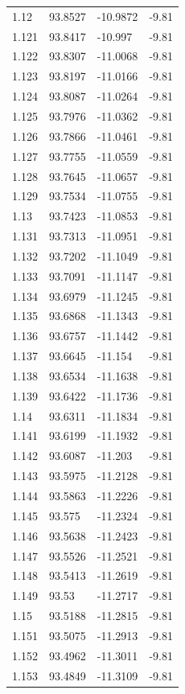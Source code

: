 \begin{tabular}{llll}
1.12 & 93.8527 & -10.9872 & -9.81 \\
1.121 & 93.8417 & -10.997 & -9.81 \\
1.122 & 93.8307 & -11.0068 & -9.81 \\
1.123 & 93.8197 & -11.0166 & -9.81 \\
1.124 & 93.8087 & -11.0264 & -9.81 \\
1.125 & 93.7976 & -11.0362 & -9.81 \\
1.126 & 93.7866 & -11.0461 & -9.81 \\
1.127 & 93.7755 & -11.0559 & -9.81 \\
1.128 & 93.7645 & -11.0657 & -9.81 \\
1.129 & 93.7534 & -11.0755 & -9.81 \\
1.13 & 93.7423 & -11.0853 & -9.81 \\
1.131 & 93.7313 & -11.0951 & -9.81 \\
1.132 & 93.7202 & -11.1049 & -9.81 \\
1.133 & 93.7091 & -11.1147 & -9.81 \\
1.134 & 93.6979 & -11.1245 & -9.81 \\
1.135 & 93.6868 & -11.1343 & -9.81 \\
1.136 & 93.6757 & -11.1442 & -9.81 \\
1.137 & 93.6645 & -11.154 & -9.81 \\
1.138 & 93.6534 & -11.1638 & -9.81 \\
1.139 & 93.6422 & -11.1736 & -9.81 \\
1.14 & 93.6311 & -11.1834 & -9.81 \\
1.141 & 93.6199 & -11.1932 & -9.81 \\
1.142 & 93.6087 & -11.203 & -9.81 \\
1.143 & 93.5975 & -11.2128 & -9.81 \\
1.144 & 93.5863 & -11.2226 & -9.81 \\
1.145 & 93.575 & -11.2324 & -9.81 \\
1.146 & 93.5638 & -11.2423 & -9.81 \\
1.147 & 93.5526 & -11.2521 & -9.81 \\
1.148 & 93.5413 & -11.2619 & -9.81 \\
1.149 & 93.53 & -11.2717 & -9.81 \\
1.15 & 93.5188 & -11.2815 & -9.81 \\
1.151 & 93.5075 & -11.2913 & -9.81 \\
1.152 & 93.4962 & -11.3011 & -9.81 \\
1.153 & 93.4849 & -11.3109 & -9.81 \\

\end{tabular}
